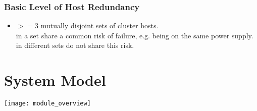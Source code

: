 \documentclass[a4paper, 11pt]{article}
\begin{document}
\subsubsection{Basic Level of Host Redundancy}
\begin{itemize}
	\item $>= 3$ mutually disjoint sets of \gls{cluster} \glspl{host}. \\  in a set share a common risk of failure, e.g. being on the same power supply.  in different sets do not share this risk.
\end{itemize}

\section{System Model}
\texttt{[image: module\_overview]}
\end{document}
